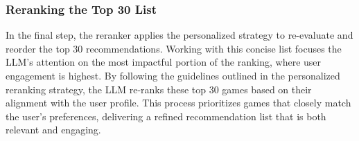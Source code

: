 \subsubsection{Reranking the Top 30 List}
In the final step, the reranker applies the personalized strategy to re-evaluate and reorder the top 30 recommendations. Working with this concise list focuses the LLM’s attention on the most impactful portion of the ranking, where user engagement is highest. By following the guidelines outlined in the personalized reranking strategy, the LLM re-ranks these top 30 games based on their alignment with the user profile. This process prioritizes games that closely match the user’s preferences, delivering a refined recommendation list that is both relevant and engaging.

